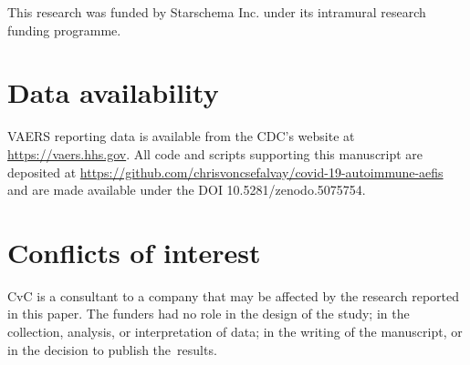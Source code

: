 \documentclass{article}
\begin{document}
This research was funded by Starschema Inc. under its intramural research funding programme.

\section*{Data availability}

VAERS reporting data is available from the CDC's website at \url{https://vaers.hhs.gov}.
All code and scripts supporting this manuscript are deposited at
\url{https://github.com/chrisvoncsefalvay/covid-19-autoimmune-aefis} and are made available under the DOI 10.5281/zenodo.5075754.

\section*{Conflicts of interest}

CvC is a consultant to a company that may be affected by the research reported in this paper.
The funders had no role in the design of the study;
in the collection, analysis, or interpretation of data;
in the writing of the manuscript, or in the decision to publish the~results.


\end{document}
